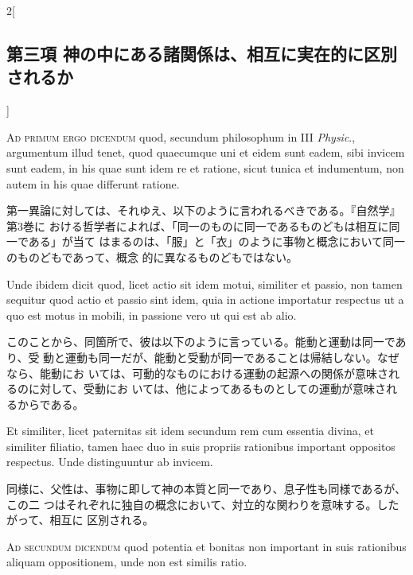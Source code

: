 \documentclass[paper=a4paper,fontsize=10pt,jafontsize=9pt,titlepage]{jlreq}
\begin{document}
\begin{paracol}{2}[\subsection{第三項 神の中にある諸関係は、相互に実在的に区別されるか}]
\switchcolumn*[\subsection{ad.1}]


{\scshape Ad primum ergo dicendum} quod, secundum philosophum in III {\itshape Physic}.,
argumentum illud tenet, quod quaecumque uni et eidem sunt eadem, sibi
invicem sunt eadem, in his quae sunt idem re et ratione, sicut tunica et
indumentum, non autem in his quae differunt ratione.


\switchcolumn


第一異論に対しては、それゆえ、以下のように言われるべきである。『自然学』第3巻に
おける哲学者によれば、「同一のものに同一であるものどもは相互に同一である」が当て
はまるのは、「服」と「衣」のように事物と概念において同一のものどもであって、概念
的に異なるものどもではない。


\switchcolumn*


Unde ibidem dicit quod, licet actio sit idem motui, similiter et passio, non
tamen sequitur quod actio et passio sint idem, quia in actione importatur
respectus ut a quo est motus in mobili, in passione vero ut qui est ab alio.


\switchcolumn


このことから、同箇所で、彼は以下のように言っている。能動と運動は同一であり、受
 動と運動も同一だが、能動と受動が同一であることは帰結しない。なぜなら、能動にお
 いては、可動的なものにおける運動の起源への関係が意味されるのに対して、受動にお
 いては、他によってあるものとしての運動が意味されるからである。


\switchcolumn*


Et similiter, licet paternitas sit idem secundum rem cum essentia
divina, et similiter filiatio, tamen haec duo in suis propriis
rationibus important oppositos respectus. Unde distinguuntur ab invicem.


\switchcolumn


同様に、父性は、事物に即して神の本質と同一であり、息子性も同様であるが、この二
 つはそれぞれに独自の概念において、対立的な関わりを意味する。したがって、相互に
 区別される。


\switchcolumn*[\subsection{ad.2}]


{\scshape Ad secundum dicendum} quod potentia et bonitas non important in suis
rationibus aliquam oppositionem, unde non est similis ratio.



\end{paracol}
\end{document}
